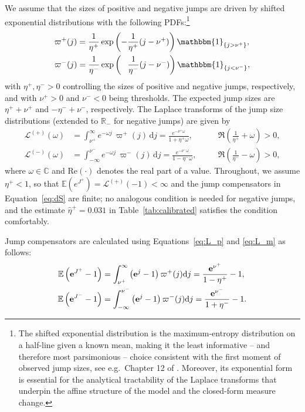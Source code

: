 \documentclass[11pt,a4paper]{article}
\numberwithin{equation}{section}
\theoremstyle{remark}
\theoremstyle{definition}
\newcommand{\E}{{\mathbb{E}}}
\providecommand{\R}{{\mathbb{R}}}
\newcommand{\e}{{\bf e}}
\newcommand{\dd}{{\rm d}}
\newcommand{\Lp}{\mathcal{L}^{(+)}}
\begin{document}
We assume that the sizes of positive and negative jumps are driven by shifted exponential distributions with the following PDFs:\footnote{
The shifted exponential distribution is the maximum-entropy distribution on a half-line given a known mean, making it the least informative -- and therefore most parsimonious -- choice consistent with the first moment of observed jump sizes, see e.g.\ Chapter 12 of \cite{Cover2006}. Moreover, its exponential form is essential for the analytical tractability of the Laplace transforms that underpin the affine structure of the model and the closed-form measure change.}
\begin{align}
\label{eq:jump}
\begin{split}
&\varpi^{+}(j)  = \frac{1}{\eta^{+}}\exp\left( -\frac{1}{\eta^{+}} (j-\nu^{+} )  \right) \mathbbm{1}_{\{j>\nu^{+}\}},\\
&\varpi^{-}(j)  = \frac{1}{\eta^{-}}\exp\left( \phantom{-}\frac{1}{\eta^{-}} (j-\nu^{-} )   \right) \mathbbm{1}_{\{j<\nu^{-}\}},
\end{split}
\end{align}
with $\eta^+,\eta^->0$ controlling the sizes of positive and negative jumps, respectively, and with $\nu^{+}>0$ and $\nu^{-}<0$ being thresholds.
The expected jump sizes are $\eta^+ + \nu^+$ and $-\eta^-+\nu^-$, respectively.
The Laplace transforms of the jump size distributions (extended to $\R_-$ for negative jumps) are given by
\begin{align}
  \mathcal L^{(+)}(\omega)
    &= \int_{\nu^+}^\infty e^{-\omega j}\,\varpi^+(j)\,\mathrm{d}j
     = \frac{e^{-\nu^+ \omega}}{1 + \eta^+ \omega},
    &&\quad  \Re\!\left(\frac{1}{\eta^+} + \omega\right) > 0,
    \label{eq:L_p} \\
  \mathcal L^{(-)}(\omega)
    &= \int_{-\infty}^{\nu^-} e^{-\omega j}\,\varpi^-(j)\,\mathrm{d}j
     = \frac{e^{-\nu^- \omega}}{1 - \eta^- \omega},
    &&\quad  \Re\!\left(\frac{1}{\eta^-} - \omega\right) > 0,
    \label{eq:L_m}
\end{align}
where $\omega\in \mathbb{C}$ and $\text{Re}(\cdot)$ denotes the real part of a value. Throughout, we assume $\eta^{+}<1$, so that $\E(e^{J^{+}})=\Lp(-1)<\infty$ and the jump compensators in Equation~\eqref{eq:dS} are finite; no analogous condition is needed for negative jumps, and the estimate $\widehat{\eta}^{+}=0.031$ in Table~\ref{tab:calibrated} satisfies the condition comfortably.

Jump compensators are calculated using Equations~\eqref{eq:L_p} and \eqref{eq:L_m} as follows:
  \begin{align*}
    \E\left(\e^{J^+}-1\right) &= \int_{\nu^+}^\infty \left(\e^{j}-1\right) \varpi^+(j) \dd j = \frac{\e^{\nu^+}}{1-\eta^+}-1,\\
    \E\left(\e^{J^-}-1\right) &= \int^{\nu^-}_{-\infty} \left(\e^{j}-1\right) \varpi^-(j) \dd j = \frac{\e^{\nu^-}}{1+\eta^-}-1.
  \end{align*}
\end{document}
